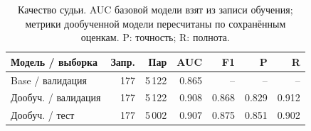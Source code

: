\begin{table}[t]
\caption{Качество судьи. AUC базовой модели взят из записи обучения; метрики дообученной модели пересчитаны по сохранённым оценкам. P: точность; R: полнота.}
\label{tab:judge-results}
\centering\small
\begin{tabularx}{\textwidth}{@{}Lrrrrrr@{}}
\toprule
Модель / выборка & Запр. & Пар & AUC & F1 & P & R \\
\midrule
Base / валидация & 177 & 5\,122 & 0.865 & -- & -- & -- \\
Дообуч. / валидация & 177 & 5\,122 & 0.908 & 0.868 & 0.829 & 0.912 \\
Дообуч. / тест & 177 & 5\,002 & 0.907 & 0.875 & 0.851 & 0.902 \\
\bottomrule
\end{tabularx}
\end{table}
